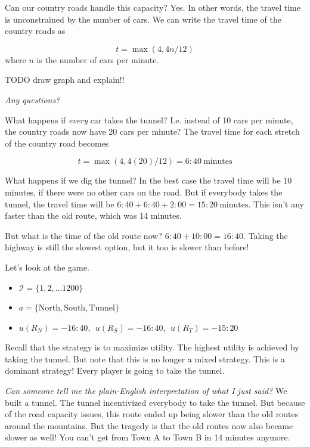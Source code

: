 \documentclass[11pt]{article}
\begin{document}
Can our country roads handle this capacity? Yes. 
In other words, the travel time is unconstrained by the number of cars.
We can write the travel time of the country roads as

$$ t = \max(4, 4n/12)$$
where $n$ is the number of cars per minute.

TODO draw graph and explain!!

{\it Any questions?}

What happens if {\it every} car takes the tunnel? I.e. instead of 10 cars per minute, the country roads now have 20 cars per minute? The travel time for each stretch of the country road becomes

$$ t = \max(4, 4(20)/12) = 6{:}40~\text{minutes}$$ 

What happens if we dig the tunnel? In the best case the travel time will be 10 minutes, if there were no other cars on the road. But if everybody takes the tunnel, the travel time will be $6{:}40 + 6{:}40  + 2{:}00 = 15{:}20~\text{minutes}$. This isn't any faster than the old route, which was 14 minutes.

But what is the time of the old route now? $6{:}40 + 10{:}00 = 16{:}40$. Taking the highway is still the slowest option, but it too is slower than before!

Let's look at the game.

\begin{itemize}
    \item $\mathcal{I} = \{1,2,\ldots 1200\}$
    \item $a = \{\text{North},\text{South},\text{Tunnel}\}$
    \item $u(R_N) = -16{:}40,~~u(R_S) = -16{:}40,~~u(R_T) = -15{:}20$
\end{itemize}

Recall that the strategy is to maximize utility. The highest utility is achieved by taking the tunnel.
But note that this is no longer a mixed strategy. This is a dominant strategy! Every player is going to take the tunnel.

{\it Can someone tell me the plain-English interpretation of what I just said?} We built a tunnel. The tunnel incentivized everybody to take the tunnel. But because of the road capacity issues, this route ended up being slower than the old routes around the mountains. But the tragedy is that the old routes now also became slower as well! You can't get from Town A to Town B in 14 minutes anymore.  
\end{document}
